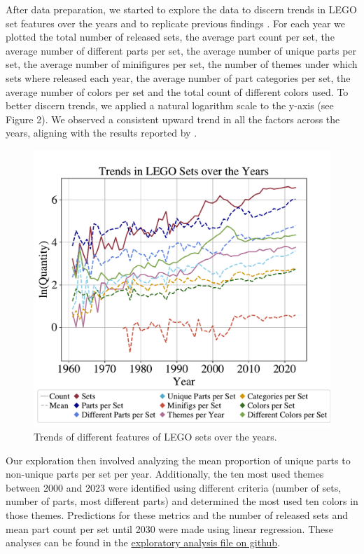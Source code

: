 \documentclass{article}
\theoremstyle{plain}
\theoremstyle{definition}
\theoremstyle{remark}
\begin{document}
After data preparation, we started to explore the data to discern trends in LEGO set features over the years and to replicate previous findings \citet{legocomplexity}. For each year we plotted the total number of released sets, the average part count per set, the average number of different parts per set, the average number of unique parts per set, the average number of minifigures per set, the number of themes under which sets where released each year, the average number of part categories per set, the average number of colors per set and the total count of different colors used. To better discern trends, we applied a natural logarithm scale to the y-axis (see Figure 2). We observed a consistent upward trend in all the factors across the years, aligning with the results reported by \citet{legocomplexity}.\\
\begin{figure}[ht]
 \vskip 0.2in
 \begin{center}
 \centerline{\includegraphics[width=\columnwidth]{../Images/Exploration.pdf}}
\caption{Trends of different features of LEGO sets over the years.}
\label{icml-historical}
 \end{center}
 \vskip -0.2in
\end{figure}
Our exploration then involved analyzing the mean proportion of unique parts to non-unique parts per set per year. Additionally, the ten most used themes between 2000 and 2023 were identified using different criteria (number of sets, number of parts, most different parts) and determined the most used ten colors in those themes. Predictions for these metrics and the number of released sets and mean part count per set until 2030 were made using linear regression. These analyses can be found in the \href{https://github.com/eddiebeach99/Data_Literacy/blob/main/Analysis/exploratory_analysis.ipynb}{exploratory analysis file on github}. \\
\end{document}
